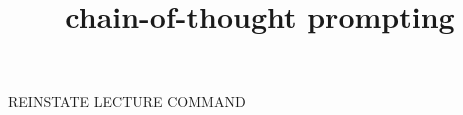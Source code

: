 


\usepackage{xspace}



\def\cotpfull{chain-of-thought prompting\xspace}
\def\cotp{COT-P\xspace}

\newcommand{\learninggoals}{
\item illustrate \cotpfull and point out the benefits it brings to LLMs
\item illustrate tree-of-thought and point out the benefits it brings to LLMs 
}

\def\myblue#1{\textcolor{texblue}{#1}}

\title{\cotpfull}
\date{}



\begin{vbframe}{REINSTATE LECTURE COMMAND}

\end{vbframe}




